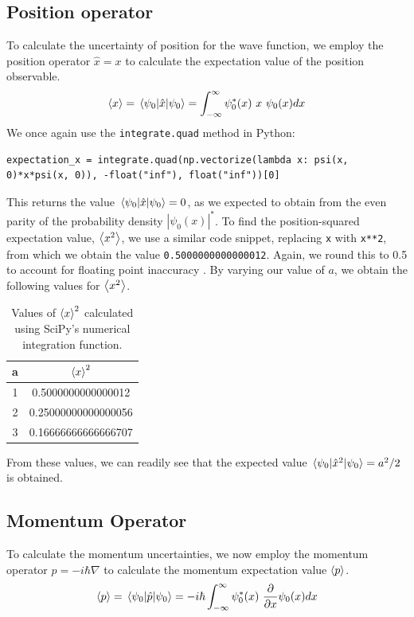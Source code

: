 \documentclass[a4paper]{article}
\begin{document}
\subsection{Position operator} \label{section:position}
To calculate the uncertainty of position for the wave function, we employ the position operator $\hat x=x$ to calculate the expectation value of the position observable. 
\begin{equation}
\expval x=\mel{\psi_0}{\hat x}{\psi_0}=\int^\infty_{-\infty}\psi_0^*(x)\ x\ \psi_0(x)dx
\end{equation}
We once again use the \lstinline$integrate.quad$ method in Python:
\begin{lstlisting}
expectation_x = integrate.quad(np.vectorize(lambda x: psi(x, 0)*x*psi(x, 0)), -float("inf"), float("inf"))[0]
\end{lstlisting} This returns the value $\mel{\psi_0}{\hat x}{\psi_0}=0$, as we expected to obtain from the even parity of the probability density $|\psi_0(x)|^*$.
To find the position-squared expectation value, $\expval{x^2}$, we use a similar code snippet, replacing \lstinline$x$ with \lstinline$x**2$, from which we obtain the value \lstinline$0.5000000000000012$. Again, we round this to 0.5 to account for floating point inaccuracy . By varying our value of $a$, we obtain the following values for $\expval{x^2}$.
\begin{table}[h!]
\centering
\begin{tabular}{cc}
a & $\expval x^2$ \\ \hline
1 & 0.5000000000000012  \\
2 & 0.25000000000000056 \\
3 & 0.16666666666666707
\end{tabular}
\caption{\label{tab:expect}Values of $\expval x^2$ calculated using SciPy's numerical integration function.}
\end{table}

From these values, we can readily see that the expected value $\mel{\psi_0}{\hat x^2}{\psi_0} = a^2/2$ is obtained.

\subsection{Momentum Operator} \label{section:momentum}
To calculate the momentum uncertainties, we now employ the momentum operator $\hat p=-i\hbar\nabla$ to calculate the momentum expectation value $\expval p$.
\begin{equation}
\expval p=\mel{\psi_0}{\hat p}{\psi_0}=-i\hbar\int^\infty_{-\infty}\psi_0^*(x)\ \frac\partial{\partial x} \psi_0(x)dx
\end{equation}
\end{document}

